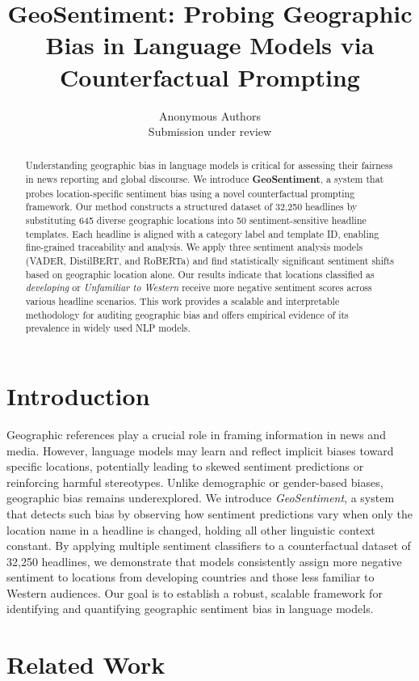 \documentclass{article} %
\title{GeoSentiment: Probing Geographic Bias in Language Models via Counterfactual Prompting}
\author{Anonymous Authors\\Submission under review}
\begin{document}
\maketitle

\begin{abstract}Understanding geographic bias in language models is critical for assessing their fairness in news reporting and global discourse. We introduce \textbf{GeoSentiment}, a system that probes location-specific sentiment bias using a novel counterfactual prompting framework. Our method constructs a structured dataset of 32,250 headlines by substituting 645 diverse geographic locations into 50 sentiment-sensitive headline templates. Each headline is aligned with a category label and template ID, enabling fine-grained traceability and analysis. We apply three sentiment analysis models (VADER, DistilBERT, and RoBERTa) and find statistically significant sentiment shifts based on geographic location alone. Our results indicate that locations classified as \textit{developing} or \textit{Unfamiliar to Western} receive more negative sentiment scores across various headline scenarios. This work provides a scalable and interpretable methodology for auditing geographic bias and offers empirical evidence of its prevalence in widely used NLP models.\end{abstract}

\section{Introduction}Geographic references play a crucial role in framing information in news and media. However, language models may learn and reflect implicit biases toward specific locations, potentially leading to skewed sentiment predictions or reinforcing harmful stereotypes. Unlike demographic or gender-based biases, geographic bias remains underexplored. We introduce \textit{GeoSentiment}, a system that detects such bias by observing how sentiment predictions vary when only the location name in a headline is changed, holding all other linguistic context constant. By applying multiple sentiment classifiers to a counterfactual dataset of 32,250 headlines, we demonstrate that models consistently assign more negative sentiment to locations from developing countries and those less familiar to Western audiences. Our goal is to establish a robust, scalable framework for identifying and quantifying geographic sentiment bias in language models.

\section{Related Work}
\end{document}
